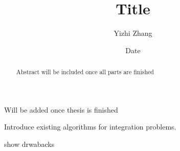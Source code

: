 \documentclass{iitthesis}
\theoremstyle{definition}
\theoremstyle{remark}
\begin{document}
\title{Title}
\author{Yizhi Zhang}
\date{Date}
\copyrightnoticetrue      %
\maketitle                %


\prelimpages         %


\begin{acknowledgement}     %
\par  Will be added once thesis is finished
\end{acknowledgement}


\tableofcontents
\clearpage

\listoftables

\clearpage

\listoffigures

\clearpage


\listofsymbols

 \clearpage



\begin{abstract}           %
\par Abstract will be included once all parts are finished
\end{abstract}


\textpages     %


Introduce existing algorithms for integration problems.

show drwabacks
\end{document}
